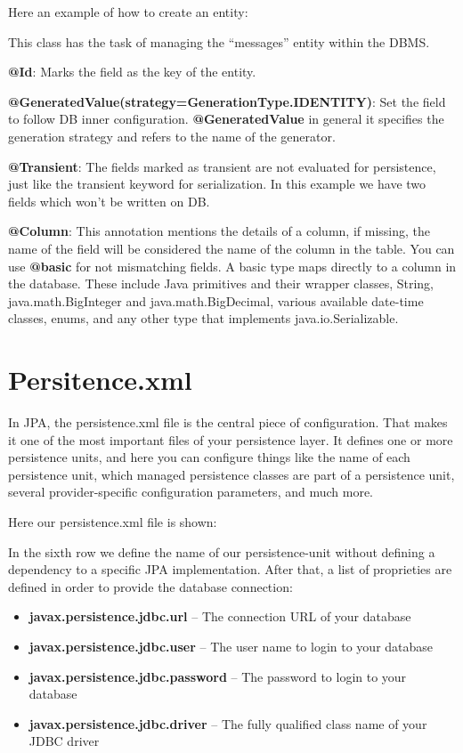 \documentclass[a4paper]{article}
\begin{document}
Here an example of how to create an entity:

This class has the task of managing the “messages” entity within the DBMS.

\textbf{@Id}: Marks the field as the key of the entity.

\textbf{@GeneratedValue(strategy=GenerationType.IDENTITY)}: Set the field to follow DB inner configuration.
\textbf{@GeneratedValue} in general it specifies the generation strategy and refers to the name of the generator.

\textbf{@Transient}: The fields marked as transient are not evaluated for persistence, just like the transient
keyword for serialization. In this example we have two fields which won’t be  written on DB.

\textbf{@Column}: This annotation mentions the details of a column, if missing, the name of the field will be considered the name of the column in the table.
You can use \textbf{@basic} for not mismatching fields. A basic type maps directly to a column in the database. These include Java primitives and their wrapper classes, String, java.math.BigInteger and java.math.BigDecimal, various available date-time classes, enums, and any other type that implements java.io.Serializable.

\section{Persitence.xml}
In JPA, the persistence.xml file is the central piece of configuration. That makes it one of the most important files of your persistence layer. It defines one or more persistence units, and here you can configure things like the name of each persistence unit, which managed persistence classes are part of a persistence unit, several provider-specific configuration parameters, and much more.

Here our persistence.xml file is shown:

In the sixth row we define the name of our persistence-unit without defining a dependency to a specific JPA implementation. After that, a list of proprieties are defined in order to provide the database connection:

\begin{itemize}
\item\textbf{javax.persistence.jdbc.url} – The connection URL of your database
\item\textbf{javax.persistence.jdbc.user} – The user name to login to your database
\item\textbf{javax.persistence.jdbc.password} – The password to login to your database
\item\textbf{javax.persistence.jdbc.driver} – The fully qualified class name of your JDBC driver
\end{itemize}
\end{document}
